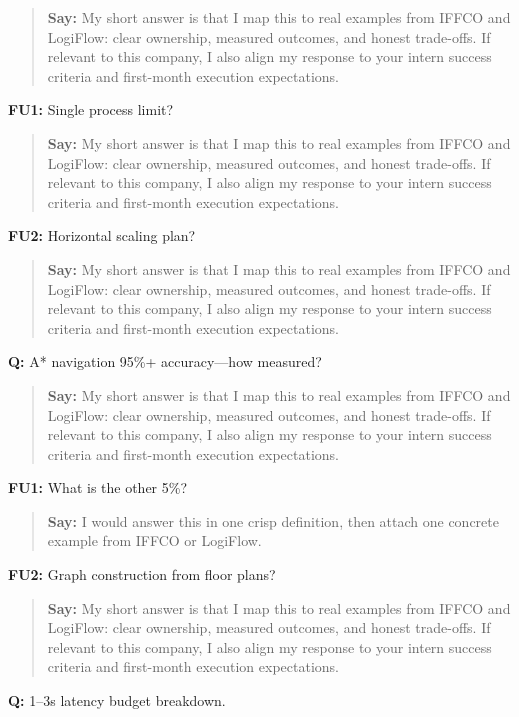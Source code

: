 \documentclass[9pt,a4paper]{article}
\begin{document}
\begin{quote}\small\textbf{Say:} My short answer is that I map this to real examples from IFFCO and LogiFlow: clear ownership, measured outcomes, and honest trade-offs. If relevant to this company, I also align my response to your intern success criteria and first-month execution expectations.\end{quote}
\vspace{2mm}
\textbf{FU1:} Single process limit?

\begin{quote}\small\textbf{Say:} My short answer is that I map this to real examples from IFFCO and LogiFlow: clear ownership, measured outcomes, and honest trade-offs. If relevant to this company, I also align my response to your intern success criteria and first-month execution expectations.\end{quote}
\vspace{2mm}
\textbf{FU2:} Horizontal scaling plan?

\begin{quote}\small\textbf{Say:} My short answer is that I map this to real examples from IFFCO and LogiFlow: clear ownership, measured outcomes, and honest trade-offs. If relevant to this company, I also align my response to your intern success criteria and first-month execution expectations.\end{quote}
\vspace{2mm}
\textbf{Q:} A* navigation 95\%+ accuracy---how measured?

\begin{quote}\small\textbf{Say:} My short answer is that I map this to real examples from IFFCO and LogiFlow: clear ownership, measured outcomes, and honest trade-offs. If relevant to this company, I also align my response to your intern success criteria and first-month execution expectations.\end{quote}
\vspace{2mm}
\textbf{FU1:} What is the other 5\%?

\begin{quote}\small\textbf{Say:} I would answer this in one crisp definition, then attach one concrete example from IFFCO or LogiFlow.\end{quote}
\vspace{2mm}
\textbf{FU2:} Graph construction from floor plans?

\begin{quote}\small\textbf{Say:} My short answer is that I map this to real examples from IFFCO and LogiFlow: clear ownership, measured outcomes, and honest trade-offs. If relevant to this company, I also align my response to your intern success criteria and first-month execution expectations.\end{quote}
\vspace{2mm}
\textbf{Q:} 1--3s latency budget breakdown.
\end{document}
